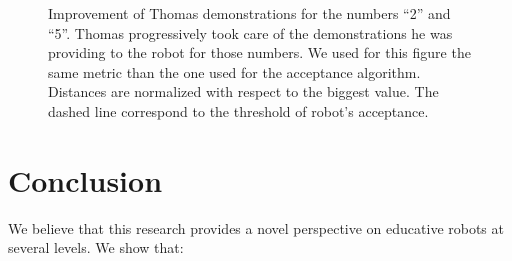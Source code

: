 \documentclass{article}
\begin{document}
\begin{figure}
    \centering
    \caption{\small Improvement of Thomas demonstrations for the numbers ``2''
        and ``5''. Thomas progressively took care of the demonstrations he was providing to the
    robot for those numbers. We used for this figure the same metric than the one
    used for the acceptance algorithm. Distances are normalized with respect to the
    biggest value. The dashed line correspond to the threshold of robot's
    acceptance.}

    \label{Thomas_progress}
\end{figure}



\section{Conclusion}

We believe that this research provides a novel perspective on educative
robots at several levels. We show that:
\end{document}
